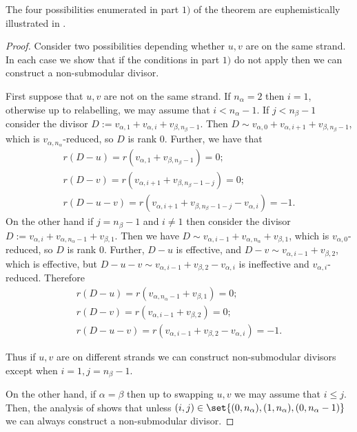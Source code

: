 The four possibilities enumerated in part $1)$ of the theorem are euphemistically illustrated in .

\begin{proof}
Consider two possibilities depending whether $u,v$ are on the same strand. In each case we show that if the conditions in part $1)$ do not apply then we can construct a non-submodular divisor.

First suppose that $u,v$ are not on the same strand. If $n_\alpha = 2$ then $i = 1$, otherwise up to relabelling, we may assume that $i<n_\alpha-1$. If $j<n_\beta-1$ consider the divisor $D:= v_{\alpha,1}+v_{\alpha,i}+v_{\beta,n_\beta-1}$. Then $D \sim v_{\alpha,0} + v_{\alpha,i+1} + v_{\beta,n_\beta-1}$, which is $v_{\alpha,n_\alpha}$-reduced, so $D$ is rank $0$.  Further, we have that
\begin{align*}
    r(D-u) = r(v_{\alpha,1}+v_{\beta,n_\beta-1})  = 0;\\
    r(D-v) = r(v_{\alpha,i+1}+v_{\beta,n_\beta-1-j}) = 0;\\
    r(D-u-v) = r(v_{\alpha,i+1}+v_{\beta,n_\beta-1-j}-v_{\alpha,i}) = -1.
\end{align*}
On the other hand if $j = n_\beta-1$ and $i \neq 1$ then consider the divisor $D:= v_{\alpha,i}+v_{\alpha,n_\alpha-1}+v_{\beta,1}$. 
Then we have $D \sim v_{\alpha,i-1} + v_{\alpha,n_\alpha} + v_{\beta,1}$, which is $v_{\alpha, 0}$-reduced, so $D$ is rank $0$. 
Further, $D-u$ is effective, and $D-v \sim v_{\alpha,i-1} + v_{\beta,2}$, which is effective, but $D-u-v \sim v_{\alpha,i-1} + v_{\beta,2} - v_{\alpha,i}$ is ineffective and $v_{\alpha,i}$-reduced. Therefore
\begin{align*}
    r(D-u) = r(v_{\alpha,n_\alpha-1}+v_{\beta,1}) = 0;\\
    r(D-v) = r(v_{\alpha,i-1}+v_{\beta,2}) = 0;\\
    r(D-u-v) = r(v_{\alpha,i-1}+v_{\beta,2}-v_{\alpha,i}) = -1.
\end{align*}

Thus if $u,v$ are on different strands we can construct non-submodular divisors except when $i = 1,j = n_\beta-1$.

On the other hand, if $\alpha = \beta$ then up to swapping $u,v$ we may assume that $i \leq j$. Then, the analysis of  shows that unless $(i,j) \in \set{(0,n_\alpha),(1,n_\alpha),(0,n_\alpha-1)}$ we can always construct a non-submodular divisor.
\end{proof}

